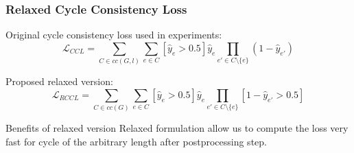 \documentclass{beamer}
\begin{document}
\begin{frame}
    \frametitle{Relaxed Cycle Consistency Loss}

    Original cycle consistency loss used in experiments:
    \[
        \mathcal{L}_{CCL} =
        \sum\limits_{C \in cc(G, l)} \sum\limits_{e \in C}
        \left[\hat{y}_e > 0.5 \right] \hat{y}_e
        \prod\limits_{e' \in C \setminus \{e\}} (1 - \hat{y}_{e'})
    \]

    Proposed relaxed version:
    \[
        \mathcal{L}_{RCCL} =
        \sum\limits_{C \in cc(G)} \sum\limits_{e \in C}
        \left[\hat{y}_e > 0.5 \right] \hat{y}_e
        \prod\limits_{e' \in C \setminus \{e\}}
        \left[ 1 - \hat{y}_{e'} > 0.5 \right]
    \]

    \begin{exampleblock}{Benefits of relaxed version}
        Relaxed formulation allow us to compute the loss very fast
        for cycle of the arbitrary length after postprocessing step.
    \end{exampleblock}

\end{frame}
\end{document}
